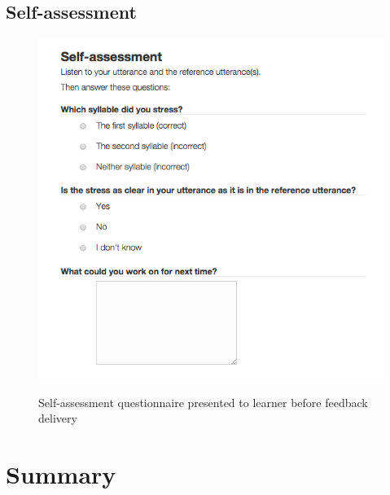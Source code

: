 	\subsection{Self-assessment}
	\label{sec:alternative:selfassess}
	
	\TODO{}
 	
 	
 	\begin{figure}
		\centering
		\caption{Self-assessment questionnaire presented to learner before feedback delivery}
		\includegraphics[width=.7\textwidth]{img/screenshots/selfAssessment}
		\label{fig:visual:selfassess}
	\end{figure}
 

%	
%	


\section{}
\label{sec:fb:system}
\TODO{}

\section{Summary}
\label{sec:fb:summary}
\TODO{}